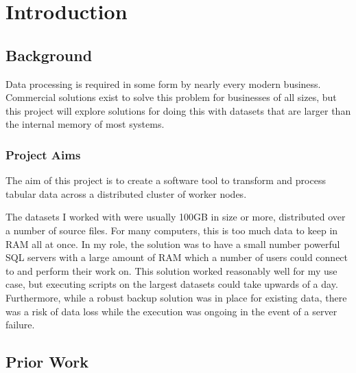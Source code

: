 \chapter{Introduction}

\section{Background}

Data processing is required in some form by nearly every modern business. Commercial solutions exist to solve this problem for businesses of all sizes, but this project will explore solutions for doing this with datasets that are larger than the internal memory of most systems.

\subsection{Project Aims}

The aim of this project is to create a software tool to transform and process tabular data across a distributed cluster of worker nodes. 

The datasets I worked with were usually 100GB in size or more, distributed over a number of source files. For many computers, this is too much data to keep in RAM all at once. In my role, the solution was to have a small number powerful SQL servers with a large amount of RAM which a number of users could connect to and perform their work on. This solution worked reasonably well for my use case, but executing scripts on the largest datasets could take upwards of a day. Furthermore, while a robust backup solution was in place for existing data, there was a risk of data loss while the execution was ongoing in the event of a server failure.




\section{Prior Work}
